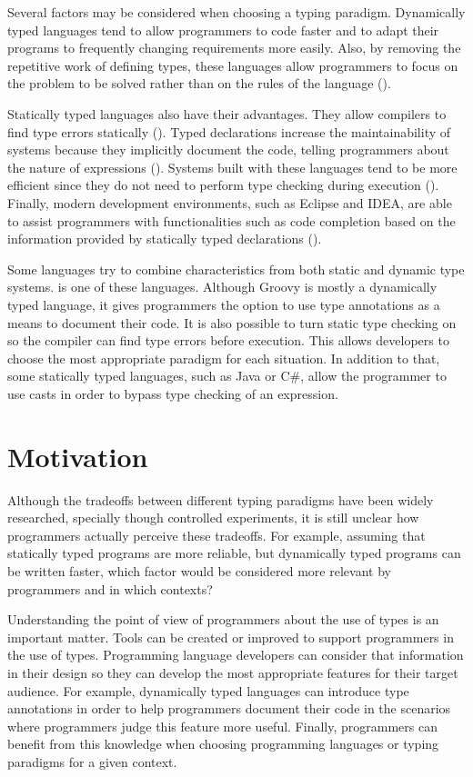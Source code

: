 \documentclass[msc]{ppgccufmg}
\begin{document}
Several factors may be considered when choosing a typing paradigm. 
Dynamically typed languages tend to allow programmers to code faster and to adapt their programs to frequently changing requirements more easily.
Also, by removing the repetitive work of defining types, these languages allow programmers to focus on the problem to be solved rather than on the rules of the language (\cite{dynamically_typed_languages}).

Statically typed languages also have their advantages. 
They allow compilers to find type errors statically (\cite{should_your_specification_language_be_typed}). 
Typed declarations increase the maintainability of systems because they implicitly document the code, telling programmers about the nature of expressions (\cite{type_systems,mayer2012static}). 
Systems built with these languages tend to be more efficient since they do not need to perform type checking during execution (\cite{Bruce2002,jit}). 
Finally, modern development environments, such as Eclipse and IDEA, are able to assist programmers with functionalities such as code completion based on the information provided by statically typed declarations (\cite{bruch2009learning}).

Some languages try to combine characteristics from both static and dynamic type systems.
\cite{groovy} is one of these languages.
Although Groovy is mostly a dynamically typed language, it gives programmers the option to use type annotations as a means to document their code.
It is also possible to turn static type checking on so the compiler can find type errors before execution.
This allows developers to choose the most appropriate paradigm for each situation.
In addition to that, some statically typed languages, such as Java or C\#, allow the programmer to use casts in order to bypass type checking of an expression.


\section{Motivation}
Although the tradeoffs between different typing paradigms have been widely researched, specially though controlled experiments, it is still unclear how programmers actually perceive these tradeoffs.
For example, assuming that statically typed programs are more reliable, but dynamically typed programs can be written faster, which factor would be considered more relevant by programmers and in which contexts?

Understanding the point of view of programmers about the use of types is an important matter.
Tools can be created or improved to support programmers in the use of types. 
Programming language developers can consider that information in their design so they can develop the most appropriate features for their target audience.
For example, dynamically typed languages can introduce type annotations in order to help programmers document their code in the scenarios where programmers judge this feature more useful.
Finally, programmers can benefit from this knowledge when choosing programming languages or typing paradigms for a given context.
\end{document}
